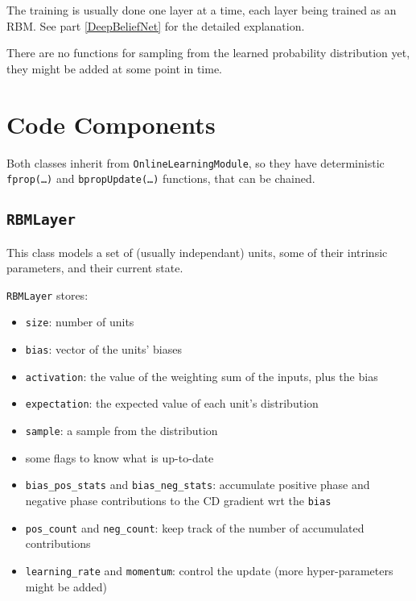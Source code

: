 \documentclass[11pt]{book}
\begin{document}
The training is usually done one layer at a time, each layer being
trained as an RBM. See part \ref{DeepBeliefNet} for the detailed
explanation.

There are no functions for sampling from the learned probability
distribution yet, they might be added at some point in time.

\section{Code Components}

Both classes inherit from {\tt OnlineLearningModule}, so they have
deterministic {\tt fprop(\ldots)} and {\tt bpropUpdate(\ldots)} functions,
that can be chained.

\subsection{\tt RBMLayer}

This class models a set of (usually independant) units, some of their
intrinsic parameters, and their current state.

{\tt RBMLayer} stores:
\begin{itemize}
    \item {\tt size}: number of units

    \item {\tt bias}: vector of the units' biases

    \item {\tt activation}: the value of the weighting sum of the
    inputs, plus the bias

    \item {\tt expectation}: the expected value of each unit's
    distribution

    \item {\tt sample}: a sample from the distribution

    \item some flags to know what is up-to-date

    \item {\tt bias\_pos\_stats} and {\tt bias\_neg\_stats}: accumulate
    positive phase and negative phase contributions to the CD gradient
    wrt the {\tt bias}

    \item {\tt pos\_count} and {\tt neg\_count}: keep track of the
    number of accumulated contributions

    \item {\tt learning\_rate} and {\tt momentum}: control the update
    (more hyper-parameters might be added)
\end{itemize}
\end{document}
